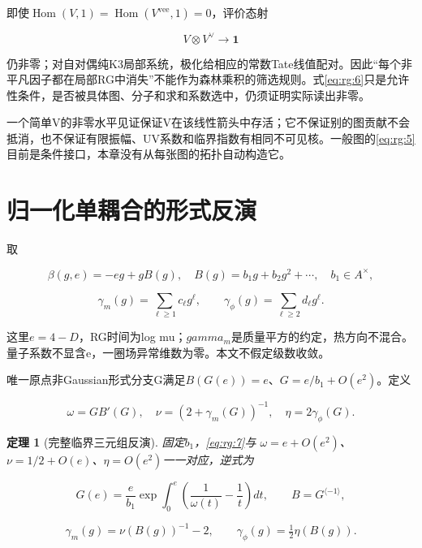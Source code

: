 \documentclass[11pt,a4paper,oneside]{ctexrep}
\theoremstyle{cnplain}
\newtheorem{theorem}{定理}[chapter]
\theoremstyle{definition}
\theoremstyle{remark}
\begin{document}
即使\(\operatorname{Hom}(V,1)=\operatorname{Hom}(V^{\mathrm{vee}},1)=0\)，评价态射

\begin{equation}
V\otimes V^\vee\longrightarrow\mathbf1
\end{equation}

仍非零；对自对偶纯K3局部系统，极化给相应的常数Tate线值配对。因此``每个非平凡因子都在局部RG中消失''不能作为森林乘积的筛选规则。式\eqref{eq:rg:6}只是允许性条件，是否被具体图、分子和求和系数选中，仍须证明实际读出非零。

一个简单V的非零水平见证保证V在该线性箭头中存活；它不保证别的图贡献不会抵消，也不保证有限振幅、UV系数和临界指数有相同不可见核。一般图的\eqref{eq:rg:5}目前是条件接口，本章没有从每张图的拓扑自动构造它。

\section{归一化单耦合的形式反演}\label{sec:rg:4}

取

\begin{equation}
\beta(g,e)=-eg+gB(g),\quad
 B(g)=b_1g+b_2g^2+\cdots,\quad b_1\in A^\times,
\end{equation}

\begin{equation}
\gamma_m(g)=\sum_{\ell\ge1}c_\ell g^\ell,\qquad
 \gamma_\phi(g)=\sum_{\ell\ge2}d_\ell g^\ell.         \label{eq:rg:7}
\end{equation}

这里\(e=4-D\)，RG时间为log mu；\(gamma_m\)是质量平方的约定，热方向不混合。量子系数不显含e，一圈场异常维数为零。本文不假定级数收敛。

唯一原点非Gaussian形式分支G满足\(B(G(e))=e\)、\(G=e/b_1+O(e^{2})\)。定义

\begin{equation}
\omega=GB'(G),\quad
 \nu=(2+\gamma_m(G))^{-1},\quad
 \eta=2\gamma_\phi(G).                             \label{eq:rg:8}
\end{equation}

\begin{theorem}[完整临界三元组反演]

\label{thm:rg:4.1} 固定\(b_1\)，\eqref{eq:rg:7}与 \(\omega =e+O(e^{2})\)、\(\nu =1/2+O(e)\)、\(\eta =O(e^{2})\)一一对应，逆式为

\begin{equation}
G(e)=\frac e{b_1}
 \exp\int_0^e\left(\frac1{\omega(t)}-\frac1t\right)dt,\qquad
 B=G^{\langle-1\rangle},                            \label{eq:rg:9}
\end{equation}

\begin{equation}
\gamma_m(g)=\nu(B(g))^{-1}-2,\qquad
 \gamma_\phi(g)=\tfrac12\eta(B(g)).                 \label{eq:rg:10}
\end{equation}

\end{theorem}
\end{document}
